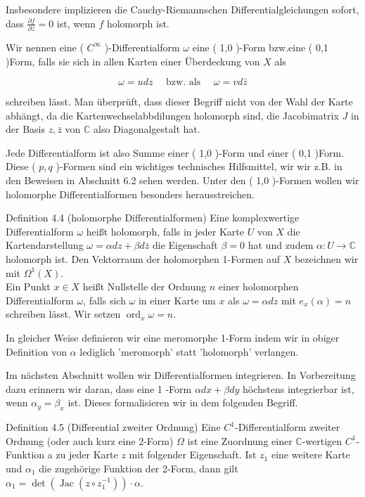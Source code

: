\documentclass[10pt, letterpaper]{article}
\begin{document}
Insbesondere implizieren die Cauchy-Riemannschen Differentialgleichungen sofort, dass $\frac{\partial f}{\partial \bar{z}}=0$ ist, wenn $f$ holomorph ist.

Wir nennen eine ( $C^{\infty}$ )-Differentialform $\omega$ eine ( 1,0 )-Form bzw.eine ( 0,1 )Form, falls sie sich in allen Karten einer Überdeckung von $X$ als

$$
\omega=u d z \quad \text { bzw. als } \quad \omega=v d \bar{z}
$$

schreiben lässt. Man überprüft, dass dieser Begriff nicht von der Wahl der Karte abhängt, da die Kartenwechselabbdilungen holomorph sind, die Jacobimatrix $J$ in der Basis $z, \bar{z}$ von $\mathbb{C}$ also Diagonalgestalt hat.

Jede Differentialform ist also Summe einer ( 1,0 )-Form und einer ( 0,1 )Form. Diese ( $p, q$ )-Formen sind ein wichtiges technisches Hilfsmittel, wir wir z.B. in den Beweisen in Abschnitt 6.2 sehen werden. Unter den ( 1,0 )-Formen wollen wir holomorphe Differentialformen besonders herausstreichen.

Definition 4.4 (holomorphe Differentialformen) Eine komplexwertige Differentialform $\omega$ heißt holomorph, falls in jeder Karte $U$ von $X$ die Kartendarstellung $\omega=\alpha d z+\beta d \bar{z}$ die Eigenschaft $\beta=0$ hat und zudem $\alpha: U \longrightarrow \mathbb{C}$ holomorph ist. Den Vektorraum der holomorphen 1-Formen auf $X$ bezeichnen wir mit $\Omega^{1}(X)$.\\
Ein Punkt $x \in X$ heißt Nullstelle der Ordnung $n$ einer holomorphen Differentialform $\omega$, falls sich $\omega$ in einer Karte um $x$ als $\omega=\alpha d z$ mit $e_{x}(\alpha)=n$ schreiben lässt. Wir setzen $\operatorname{ord}_{x} \omega=n$.

In gleicher Weise definieren wir eine meromorphe 1-Form indem wir in obiger Definition von $\alpha$ lediglich 'meromorph' statt 'holomorph' verlangen.

Im nächsten Abschnitt wollen wir Differentialformen integrieren. In Vorbereitung dazu erinnern wir daran, dass eine 1 -Form $\alpha d x+\beta d y$ höchstens integrierbar ist, wenn $\alpha_{y}=\beta_{x}$ ist. Dieses formalisieren wir in dem folgenden Begriff.

Definition 4.5 (Differential zweiter Ordnung) Eine $C^{1}$-Differentialform zweiter Ordnung (oder auch kurz eine 2-Form) $\Omega$ ist eine Zuordnung einer $\mathbb{C}$-wertigen $C^{1}$-Funktion a zu jeder Karte $z$ mit folgender Eigenschaft. Ist $z_{1}$ eine weitere Karte und $\alpha_{1}$ die zugehörige Funktion der 2-Form, dann gilt $\alpha_{1}=\operatorname{det}\left(\operatorname{Jac}\left(z \circ z_{1}^{-1}\right)\right) \cdot \alpha$.
\end{document}

